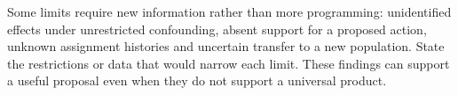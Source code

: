 Some limits require new information rather than more programming: unidentified
effects under unrestricted confounding, absent support for a proposed action,
unknown assignment histories and uncertain transfer to a new population. State
the restrictions or data that would narrow each limit. These findings can
support a useful proposal even when they do not support a universal product.


